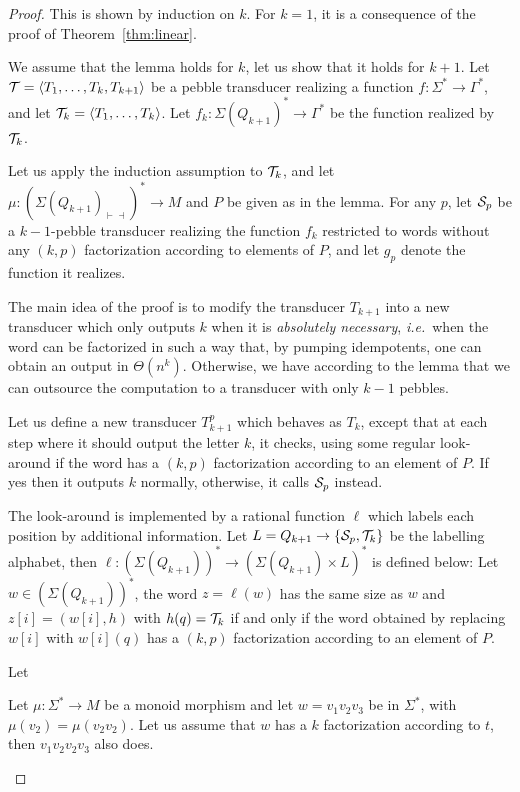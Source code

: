 \begin{proof}
    This is shown by induction on $k$.
    For $k=1$, it is a consequence of the proof of Theorem~\ref{thm:linear}.

    We assume that the lemma holds for $k$, let us show that it holds for $k+1$.
    Let ${\mathcal T}=\langle T_1,\ldots,T_k,T_{k+1} \rangle$ be a pebble transducer realizing a function $f:\Sigma^*\rightarrow\Gamma^*$, and let ${\mathcal T}_k=\langle T_1,\ldots,T_k \rangle$. Let $f_k:\Sigma(Q_{k+1})^*\rightarrow \Gamma^*$ be the function realized by ${\mathcal T}_k$.

    Let us apply the induction assumption to ${\mathcal T}_k$, and let $\mu:(\Sigma(Q_{k+1})_{\vdash\dashv})^*\rightarrow M$ and $P$ be given as in the lemma. For any $p$, let ${\mathcal S}_p$ be a $k{-}1$-pebble transducer realizing the function $f_k$ restricted to words without any $(k,p)$ factorization according to elements of $P$, and let $g_p$ denote the function it realizes.

    The main idea of the proof is to modify the transducer $T_{k+1}$ into a new transducer which only outputs $k$ when it is \emph{absolutely necessary}, \textit{i.e.}~when the word can be factorized in such a way that, by pumping idempotents, one can obtain an output in $\Theta(n^k)$.
    Otherwise, we have according to the lemma that we can outsource the computation to a transducer with only $k-1$ pebbles.

    Let us define a new transducer $T_{k+1}^p$ which behaves as $T_k$, except that at each step where it should output the letter $k$, it checks, using some regular look-around if the word has a $(k,p)$ factorization according to an element of $P$. If yes then it outputs $k$ normally, otherwise, it calls ${\mathcal S}_p$ instead.

    The look-around is implemented by a rational function $\ell$ which labels each position by additional information.
    Let $L=Q_{k+1}\rightarrow \{{\mathcal S}_p,{\mathcal T}_k\}$ be the labelling alphabet, then $\ell:(\Sigma(Q_{k+1}))^*\rightarrow (\Sigma(Q_{k+1})\times L)^*$ is defined below:
    Let $w\in (\Sigma(Q_{k+1}))^*$, the word $z=\ell(w)$ has the same size as $w$ and $z[i]=(w[i],h)$ with $h(q)={\mathcal T}_k$ if and only if the word obtained by replacing $w[i]$ with $w[i](q)$ has a $(k,p)$ factorization according to an element of $P$.

    Let
    \begin{claim}
        Let $\mu:\Sigma^*\rightarrow M$ be a monoid morphism and let $w=v_1v_2v_3$ be in $ \Sigma^*$, with $\mu(v_2)=\mu(v_2v_2)$.
        Let us assume that $w$ has a $k$ factorization according to $t$, then $v_1v_2v_2v_3$ also does.
    \end{claim}
\end{proof}

